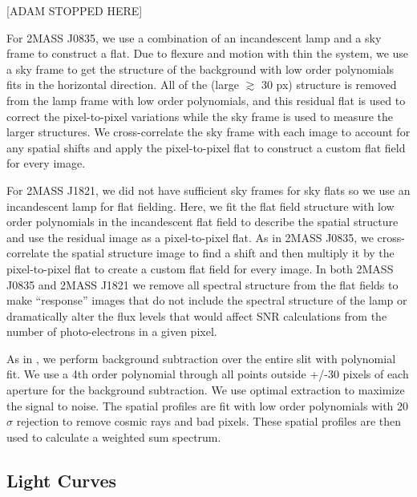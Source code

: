 \documentclass[twocolumn]{aastex6}
\begin{document}
[ADAM STOPPED HERE]

For 2MASS J0835, we use a combination of an incandescent lamp and a sky frame to construct a flat.
Due to flexure and motion with thin the system, we use a sky frame to get the structure of the background with low order polynomials fits in the horizontal direction.
All of the (large $\gtrsim$ 30 px) structure is removed from the lamp frame with low order polynomials, and this residual flat is used to correct the pixel-to-pixel variations while the sky frame is used to measure the larger structures.
We cross-correlate the sky frame with each image to account for any spatial shifts and apply the pixel-to-pixel flat to construct a custom flat field for every image.

For 2MASS J1821, we did not have sufficient sky frames for sky flats so we use an incandescent lamp for flat fielding.
Here, we fit the flat field structure with low order polynomials in the incandescent flat field to describe the spatial structure and use the residual image as a pixel-to-pixel flat.
As in 2MASS J0835, we cross-correlate the spatial structure image to find a shift and then multiply it by the pixel-to-pixel flat to create a custom flat field for every image.
In both 2MASS J0835 and 2MASS J1821 we remove all spectral structure from the flat fields to make ``response'' images that do not include the spectral structure of the lamp or dramatically alter the flux levels that would affect SNR calculations from the number of photo-electrons in a given pixel.

As in \citet{2016ApJ...826..156S}, we perform background subtraction over the entire slit with polynomial fit.
We use a 4th order polynomial through all points outside +/-30 pixels of each aperture for the background subtraction.
We use optimal extraction \citep{horne1986optimalE} to maximize the signal to noise.
The spatial profiles are fit with low order polynomials with 20$\sigma$ rejection to remove cosmic rays and bad pixels.
These spatial profiles are then used to calculate a weighted sum spectrum.



\subsection{Light Curves}
\end{document}
